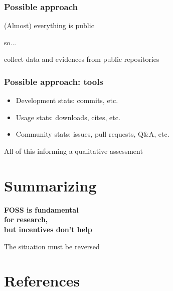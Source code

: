 \documentclass[17pt,aspectratio=169,hyperref={pdfusetitle,colorlinks,allcolors=olive}]{beamer}
\begin{document}
\begin{frame}[fragile]
  \frametitle{Possible approach}

  \begin{center}
    (Almost) everything is public

    so...

    collect data and evidences from public repositories
  \end{center}

\end{frame}

\begin{frame}[fragile]
  \frametitle{Possible approach: tools}

  \begin{itemize}
  \item Development stats: commits, etc.
  \item Usage stats: downloads, cites, etc.
  \item Community stats: issues, pull requests, Q\&A, etc.
  \end{itemize}

  All of this informing a qualitative assessment

\end{frame}

\section{Summarizing}

\begin{frame}[fragile]

  {\Large \bf
    FOSS is fundamental \\
    for research, \\
    but incentives don't help \\

    \vspace{1cm}
    
    The situation must be reversed \\
  }
\end{frame}

\section*{References}
\end{document}
